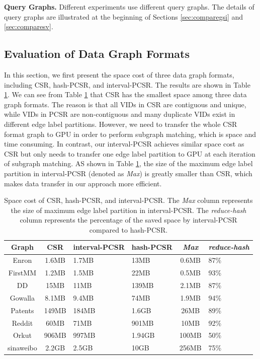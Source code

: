 \textbf{Query Graphs.} Different experiments use different query graphs. The details of query graphs are illustrated at the beginning of Sections \ref{sec:comparegsi} and \ref{sec:comparesv}.

\subsection{Evaluation of Data Graph Formats}
In this section, we first present the space cost of three data graph formats, including CSR, hash-PCSR, and  interval-PCSR. The results are shown in Table \ref{tab:graphsize}. We can see from Table \ref{tab:graphsize} that CSR has the smallest space among three data graph formats. The reason is that all VIDs in CSR are contiguous and unique, while VIDs in PCSR are non-contiguous and many duplicate VIDs exist in different edge label partitions. However, we need to transfer the whole CSR format graph to GPU in order to perform subgraph matching, which is space and time consuming. In contrast, our interval-PCSR achieves similar space cost as CSR but only needs to transfer one edge label partition to GPU at each iteration of subgraph matching. AS shown in Table \ref{tab:graphsize}, the size of the maximum edge label partition in interval-PCSR (denoted as \emph{Max}) is greatly smaller than CSR, which makes data transfer in our approach more efficient.


\begin{table}
\centering
  \caption{Space cost of CSR, hash-PCSR, and interval-PCSR. The \emph{Max} column represents the size of maximum edge label partition in interval-PCSR. The \emph{reduce-hash} column represents the percentage of the saved space by interval-PCSR compared to hash-PCSR.}
  \label{tab:graphsize}
  \begin{tabular}{ccp{30pt}p{30pt}cp{30pt}}
  \hline
    Graph &CSR&interval-PCSR&hash-PCSR&\emph{Max}&\emph{reduce-hash}\\
    \hline
    Enron 		&1.6MB	&1.7MB	&13MB	&0.6MB	&87\% \\
    FirstMM 	&1.2MB	&1.5MB	&22MB	&0.5MB	&93\% \\
    DD 			&15MB	&11MB	&139MB	&2.1MB	&87\% \\
    Gowalla 	&8.1MB	&9.4MB	&74MB	&1.9MB	&94\% \\
    Patents 	&149MB	&184MB	&1.6GB	&26MB	&89\% \\
    Reddit 		&60MB	&71MB	&901MB	&10MB	&92\% \\
    Orkut 		&906MB	&997MB	&1.94GB	&100MB	&50\% \\
    sinaweibo	&2.2GB	&2.5GB	&10GB	&256MB	&75\% \\

    \hline
  \end{tabular}
\end{table}

